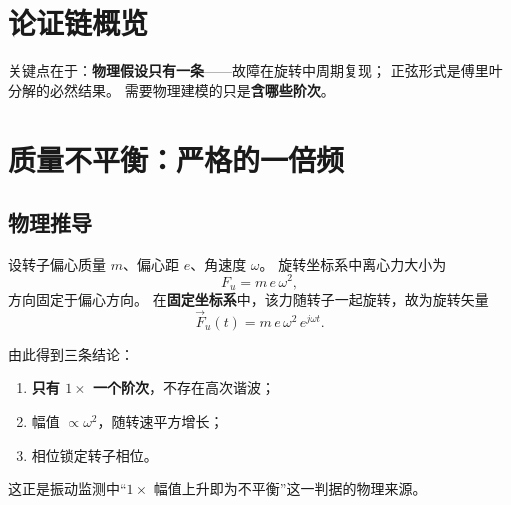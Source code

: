 \documentclass[11pt,a4paper]{ctexart}
\begin{document}
\section{论证链概览}

\begin{center}
\end{center}

关键点在于：\textbf{物理假设只有一条}——故障在旋转中周期复现；
正弦形式是傅里叶分解的必然结果。
需要物理建模的只是\textbf{含哪些阶次}。

\section{质量不平衡：严格的一倍频}
\label{sec:unb}

\subsection{物理推导}

设转子偏心质量 $m$、偏心距 $e$、角速度 $\omega$。
旋转坐标系中离心力大小为
\begin{equation}
F_u=m\,e\,\omega^2,
\end{equation}
方向固定于偏心方向。
在\textbf{固定坐标系}中，该力随转子一起旋转，故为旋转矢量
\begin{equation}
\vec F_u(t)=m\,e\,\omega^2\,e^{j\omega t}.
\end{equation}

由此得到三条结论：
\begin{enumerate}[label=(\alph*)]
\item \textbf{只有 $1\times$ 一个阶次}，不存在高次谐波；
\item 幅值 $\propto\omega^2$，随转速平方增长；
\item 相位锁定转子相位。
\end{enumerate}

这正是振动监测中“$1\times$ 幅值上升即为不平衡”这一判据的物理来源。
\end{document}
